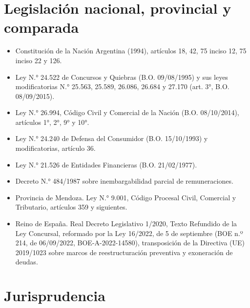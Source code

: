 \documentclass[12pt,oneside]{book}
\begin{document}
{\section*{Legislación nacional, provincial y comparada}

\begin{itemize}[leftmargin=1.2em]
    \item Constitución de la Nación Argentina (1994), artículos 18, 42, 75 inciso 12, 75 inciso 22 y 126.
    \item Ley N.° 24.522 de Concursos y Quiebras (B.O. 09/08/1995) y sus leyes modificatorias N.° 25.563, 25.589, 26.086, 26.684 y 27.170 (art. 3°, B.O. 08/09/2015).
    \item Ley N.° 26.994, Código Civil y Comercial de la Nación (B.O. 08/10/2014), artículos 1°, 2°, 9° y 10°.
    \item Ley N.° 24.240 de Defensa del Consumidor (B.O. 15/10/1993) y modificatorias, artículo 36.
    \item Ley N.° 21.526 de Entidades Financieras (B.O. 21/02/1977).
    \item Decreto N.° 484/1987 sobre inembargabilidad parcial de remuneraciones.
    \item Provincia de Mendoza. Ley N.° 9.001, Código Procesal Civil, Comercial y Tributario, artículos 359 y siguientes.
    \item Reino de España. Real Decreto Legislativo 1/2020, Texto Refundido de la Ley Concursal, reformado por la Ley 16/2022, de 5 de septiembre (BOE n.º 214, de 06/09/2022, BOE-A-2022-14580), transposición de la Directiva (UE) 2019/1023 sobre marcos de reestructuración preventiva y exoneración de deudas.
\end{itemize}

\section*{Jurisprudencia}

}
\end{document}
